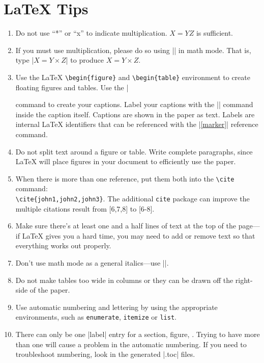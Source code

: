 \section{\LaTeX{} Tips}
\begin{enumerate}
\item Do not use ``*'' or ``x'' to indicate multiplication.  $X=YZ$ is sufficient.
\item If you must use multiplication, please do so using |\times| in
  math mode. That is, type |$X=Y\times Z$| to produce $X=Y\times Z$.
\item Use the \LaTeX{} \verb|\begin{figure}| and \verb|\begin{table}| environment to
  create floating figures and tables. Use the |\caption| command
  to create your captions. Label your captions with the
  |\label{marker}| command inside the caption itself. Captions are shown
  in the paper as text.  Labels are internal \LaTeX{} identifiers that can
  be referenced with the |\ref{marker}| reference command.
\item Do not split text around a figure or table.  Write complete paragraphs,
  since \LaTeX{} will place figures in your document to efficiently use the paper.  
\item When there is more than one reference, put them both into the 
  \verb|\cite| command: \\ \verb|\cite{john1,john2,john3}|.  The additional \texttt{cite} package
  can improve the multiple citations result from [6,7,8] to [6-8].
\item Make sure there's at least one and a half lines of text at the
  top of the page---if \LaTeX{} gives you a hard time, you may need to
  add or remove text so that everything works out properly.
\item Don't use math mode as a general italics---use |\emph{}|. 
\item Do not make tables too wide in columns or they can be drawn off the right-side of the paper.
\item Use automatic numbering and lettering by using the appropriate environments, such as
  \texttt{enumerate}, \texttt{itemize} or \texttt{list}.
\item There can only be one |label| entry for a section, figure, \etc.  Trying to have more than one will
  cause a problem in the automatic numbering.  If you need to troubleshoot numbering, look in the generated |.toc| files.
\end{enumerate}

